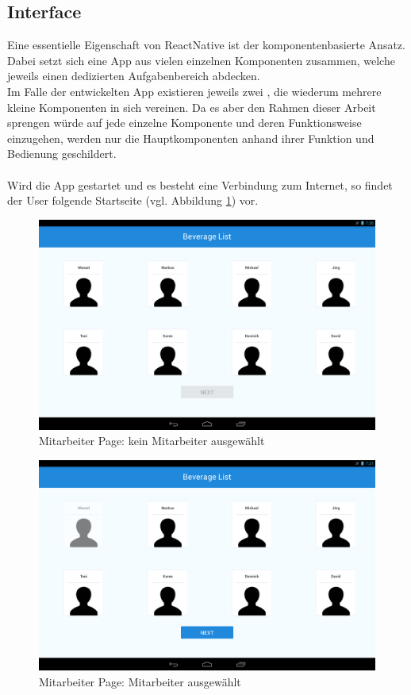 \subsection{Interface}
\label{subsec:interface}
Eine essentielle Eigenschaft von ReactNative ist der komponentenbasierte Ansatz. Dabei setzt sich eine App aus vielen einzelnen Komponenten zusammen, welche jeweils einen dedizierten Aufgabenbereich abdecken. \\
Im Falle der entwickelten App existieren jeweils zwei , die wiederum mehrere kleine Komponenten in sich vereinen. 
Da es aber den Rahmen dieser Arbeit sprengen würde auf jede einzelne Komponente und deren Funktionsweise einzugehen, werden nur die Hauptkomponenten anhand ihrer Funktion und Bedienung geschildert. \\\\
Wird die App gestartet und es besteht eine Verbindung zum Internet, so findet der User folgende Startseite (vgl. Abbildung \ref{img:emps1}) vor.

\begin{figure}[th!]
	\centering
	\includegraphics[width=.9\columnwidth]{./Abbildungen/Kapitel_03/emps1.png}
	\caption{Mitarbeiter Page: kein Mitarbeiter ausgewählt}
	\label{img:emps1}
\end{figure}

\begin{figure}[th!]
	\centering
	\includegraphics[width=.9\columnwidth]{./Abbildungen/Kapitel_03/emps2.png}
	\caption{Mitarbeiter Page: Mitarbeiter ausgewählt}
	\label{img:emps2}
\end{figure}


